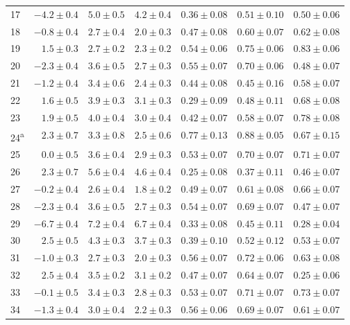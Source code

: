 \begin{tabular}{l r r r r r r}
17 & $-4.2 \pm 0.4$ & $5.0 \pm 0.5$ & $4.2 \pm 0.4$ & $0.36 \pm 0.08$ & $0.51 \pm 0.10$ & $0.50 \pm 0.06$ \\ 
18 & $-0.8 \pm 0.4$ & $2.7 \pm 0.4$ & $2.0 \pm 0.3$ & $0.47 \pm 0.08$ & $0.60 \pm 0.07$ & $0.62 \pm 0.08$ \\ 
19 & $1.5 \pm 0.3$ & $2.7 \pm 0.2$ & $2.3 \pm 0.2$ & $0.54 \pm 0.06$ & $0.75 \pm 0.06$ & $0.83 \pm 0.06$ \\ 
20 & $-2.3 \pm 0.4$ & $3.6 \pm 0.5$ & $2.7 \pm 0.3$ & $0.55 \pm 0.07$ & $0.70 \pm 0.06$ & $0.48 \pm 0.07$ \\ 
21 & $-1.2 \pm 0.4$ & $3.4 \pm 0.6$ & $2.4 \pm 0.3$ & $0.44 \pm 0.08$ & $0.45 \pm 0.16$ & $0.58 \pm 0.07$ \\ 
22 & $1.6 \pm 0.5$ & $3.9 \pm 0.3$ & $3.1 \pm 0.3$ & $0.29 \pm 0.09$ & $0.48 \pm 0.11$ & $0.68 \pm 0.08$ \\ 
23 & $1.9 \pm 0.5$ & $4.0 \pm 0.4$ & $3.0 \pm 0.4$ & $0.42 \pm 0.07$ & $0.58 \pm 0.07$ & $0.78 \pm 0.08$ \\ 
24\textsuperscript{a} & $2.3 \pm 0.7$ & $3.3 \pm 0.8$ & $2.5 \pm 0.6$ & $0.77 \pm 0.13$ & $0.88 \pm 0.05$ & $0.67 \pm 0.15$ \\ 
25 & $0.0 \pm 0.5$ & $3.6 \pm 0.4$ & $2.9 \pm 0.3$ & $0.53 \pm 0.07$ & $0.70 \pm 0.07$ & $0.71 \pm 0.07$ \\ 
26 & $2.3 \pm 0.7$ & $5.6 \pm 0.4$ & $4.6 \pm 0.4$ & $0.25 \pm 0.08$ & $0.37 \pm 0.11$ & $0.46 \pm 0.07$ \\ 
27 & $-0.2 \pm 0.4$ & $2.6 \pm 0.4$ & $1.8 \pm 0.2$ & $0.49 \pm 0.07$ & $0.61 \pm 0.08$ & $0.66 \pm 0.07$ \\ 
28 & $-2.3 \pm 0.4$ & $3.6 \pm 0.5$ & $2.7 \pm 0.3$ & $0.54 \pm 0.07$ & $0.69 \pm 0.07$ & $0.47 \pm 0.07$ \\ 
29 & $-6.7 \pm 0.4$ & $7.2 \pm 0.4$ & $6.7 \pm 0.4$ & $0.33 \pm 0.08$ & $0.45 \pm 0.11$ & $0.28 \pm 0.04$ \\ 
30 & $2.5 \pm 0.5$ & $4.3 \pm 0.3$ & $3.7 \pm 0.3$ & $0.39 \pm 0.10$ & $0.52 \pm 0.12$ & $0.53 \pm 0.07$ \\ 
31 & $-1.0 \pm 0.3$ & $2.7 \pm 0.3$ & $2.0 \pm 0.3$ & $0.56 \pm 0.07$ & $0.72 \pm 0.06$ & $0.63 \pm 0.08$ \\ 
32 & $2.5 \pm 0.4$ & $3.5 \pm 0.2$ & $3.1 \pm 0.2$ & $0.47 \pm 0.07$ & $0.64 \pm 0.07$ & $0.25 \pm 0.06$ \\ 
33 & $-0.1 \pm 0.5$ & $3.4 \pm 0.3$ & $2.8 \pm 0.3$ & $0.53 \pm 0.07$ & $0.71 \pm 0.07$ & $0.73 \pm 0.07$ \\ 
34 & $-1.3 \pm 0.4$ & $3.0 \pm 0.4$ & $2.2 \pm 0.3$ & $0.56 \pm 0.06$ & $0.69 \pm 0.07$ & $0.61 \pm 0.07$ \\ 

\end{tabular}
